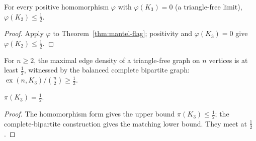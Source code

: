 \begin{theorem}
  \label{thm:mantel-hom}
  \leanok
  For every positive homomorphism $\varphi$ with $\varphi(K_3) = 0$ (a
  triangle-free limit), $\varphi(K_2) \le \tfrac12$.
\end{theorem}
\begin{proof}
  \leanok
  Apply $\varphi$ to Theorem~\ref{thm:mantel-flag}; positivity and
  $\varphi(K_3)=0$ give $\varphi(K_2) \le \tfrac12$.
\end{proof}

\begin{lemma}
  \label{lem:lower-bound}
  \leanok
  For $n \ge 2$, the maximal edge density of a triangle-free graph on $n$
  vertices is at least $\tfrac12$, witnessed by the balanced complete bipartite
  graph:
  $\operatorname{ex}(n,K_3)/\binom{n}{2} \ge \tfrac12$.
\end{lemma}

\begin{theorem}
  \label{thm:turan-k3}
  \leanok
  $\pi(K_3) = \tfrac12$.
\end{theorem}
\begin{proof}
  \leanok
  The homomorphism form gives the upper bound $\pi(K_3) \le \tfrac12$; the
  complete-bipartite construction gives the matching lower bound. They meet at
  $\tfrac12$.
\end{proof}
